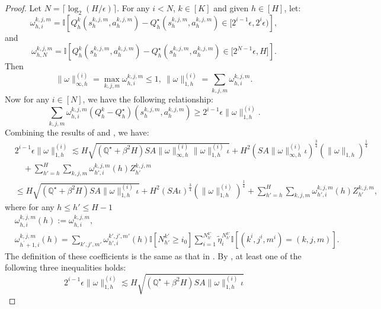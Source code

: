 \documentclass{article}
\begin{document}
\begin{proof}
Let $N =\lceil \log_2(H/\epsilon) \rceil$. For any $i < N$, $k \in [K]$ and given $h \in [H]$, let:
$$\omega_{h,i}^{k,j,m} = \mathbb{I}\left[Q_h^k(s_h^{k,j,m}, a_h^{k,j,m}) - Q_h^{\star}(s_h^{k,j,m}, a_h^{k,j,m}) \in \big[2^{i-1}\epsilon,2^i\epsilon\big)\right],$$
and
$$\omega_{h,N}^{k,j,m} = \mathbb{I}\left[Q_h^k(s_h^{k,j,m}, a_h^{k,j,m}) - Q_h^{\star}(s_h^{k,j,m}, a_h^{k,j,m}) \in \big[2^{N-1}\epsilon,H\big]\right].$$
Then
$$\|\omega\|_{\infty,h}^{(i)} = \mathop{\max}\limits_{k,j,m}\omega_{h,i}^{k,j,m} \leq 1,\ \|\omega\|_{1,h}^{(i)} = \sum_{k,j,m}\omega_{h,i}^{k,j,m}.$$
Now for any $i \in [N]$, we have the following relationship:
\begin{equation}
        \label{gapdifflower}
        \sum_{k,j,m} \omega_{h,i}^{k,j,m} \left(Q_h^k - Q_h^{\star}\right)(s_h^{k,j,m}, a_h^{k,j,m}) \geq 2^{i-1}\epsilon\|\omega\|_{1,h}^{(i)}.
    \end{equation}
    Combining the results of  and , we have:
    \begin{align}
    \label{gapini}
        &2^{i-1}\epsilon\|\omega\|_{1,h}^{(i)} \lesssim H\sqrt{(\mathbb{Q^{\star}}+\beta^2H)SA\|\omega\|_{\infty,h}^{(i)}\|\omega\|_{1,h}^{(i)}\iota} + H^2(SA\|\omega\|_{\infty,h}^{(i)}\iota)^{\frac{3}{4}}(\|\omega\|_{1,h})^{\frac{1}{4}} \nonumber\\
        &\quad+ \sum_{h' = h}^{H}\sum_{k,j,m} \omega_{h',i}^{k,j,m}(h)Z_{h'}^{k,j,m} \nonumber\\
        &\leq H\sqrt{(\mathbb{Q^{\star}}+\beta^2H)SA\|\omega\|_{1,h}^{(i)}\iota} + H^2(SA\iota)^{\frac{3}{4}}(\|\omega\|_{1,h}^{(i)})^{\frac{1}{4}}  + \sum_{h' = h}^{H}\sum_{k,j,m} \omega_{h',i}^{k,j,m}(h)Z_{h'}^{k,j,m},
    \end{align}
    where for any $ h \leq h' \leq H-1$
    \begin{align*}
    &\omega_{h,i}^{k,j,m}(h) := \omega_{h,i}^{k,j,m}, \nonumber\\  
    &\omega_{h^\prime+1,i}^{k,j,m}(h)  = \sum_{k',j',m'}\omega_{h',i}^{k',j',m'}(h)\mathbb{I}\left[N_{h'}^{k'} \geq i_0 \right]\sum_{i = 1}^{N_{h'}^{k'}}\tilde{\eta}_i^{N_{h'}^{k'}}\mathbb{I}\left[(k^i,j^i,m^i) = (k,j,m) \right].
\end{align*}
The definition of these coefficients is the same as that in . By , at least one of the following three inequalities holds:
$$2^{i-1}\epsilon\|\omega\|_{1,h}^{(i)} \lesssim H\sqrt{(\mathbb{Q^{\star}}+\beta^2H)SA\|\omega\|_{1,h}^{(i)}\iota}$$

\end{proof}
\end{document}
